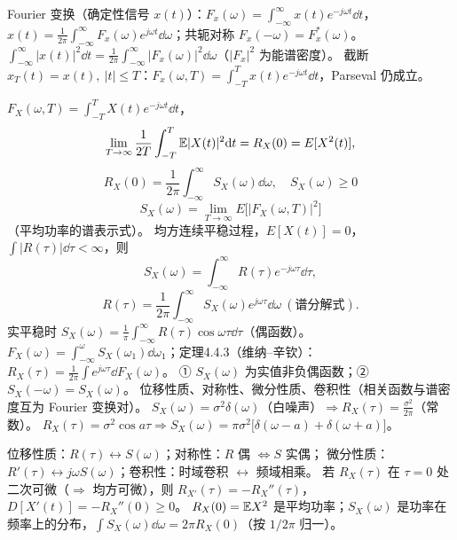 \documentclass[UTF8,12pt,a4paper]{ctexart}
\begin{document}
Fourier 变换（确定性信号 $x(t)$）：$F_x(\omega)=\int_{-\infty}^{\infty}x(t)e^{-j\omega t}\dd t$，$x(t)=\frac1{2\pi}\int_{-\infty}^{\infty}F_x(\omega)e^{j\omega t}\dd\omega$；共轭对称 $F_x(-\omega)=F_x^*(\omega)$。
 $\displaystyle\int_{-\infty}^{\infty}|x(t)|^2\dd t=\frac1{2\pi}\int_{-\infty}^{\infty}|F_x(\omega)|^2\dd\omega$（$|F_x|^2$ 为能谱密度）。
截断 $x_T(t)=x(t),\ |t|\le T$：$F_x(\omega,T)=\int_{-T}^{T}x(t)e^{-j\omega t}\dd t$，Parseval 仍成立。

 $F_X(\omega,T)=\int_{-T}^{T}X(t)e^{-j\omega t}\dd t$，
$$\lim_{T\to\infty}\frac1{2T}\int_{-T}^{T}\mathbb{E}|X(t)|^2\mathrm{d} t=R_X(0)=E[X^2(t)],$$
$$\boxed{R_X(0)=\frac1{2\pi}\int_{-\infty}^{\infty}S_X(\omega)\dd\omega,\quad S_X(\omega)\ge0}$$
$$S_X(\omega)=\lim_{T\to\infty}E\big[|F_X(\omega,T)|^2\big]$$
（平均功率的谱表示式）。
 均方连续平稳过程，$E[X(t)]=0$，$\int|R(\tau)|\dd\tau<\infty$，则
$$S_X(\omega)=\int_{-\infty}^{\infty}R(\tau)e^{-j\omega\tau}\dd\tau,$$
$$R(\tau)=\frac1{2\pi}\int_{-\infty}^{\infty}S_X(\omega)e^{j\omega\tau}\dd\omega\ (\text{谱分解式}).$$
实平稳时 $S_X(\omega)=\frac1\pi\int_{-\infty}^{\infty}R(\tau)\cos\omega\tau\dd\tau$（偶函数）。
 $F_X(\omega)=\int_{-\infty}^{\omega}S_X(\omega_1)\dd\omega_1$；定理4.4.3（维纳--辛钦）：$R_X(\tau)=\frac1{2\pi}\int e^{j\omega\tau}\dd F_X(\omega)$。
 ① $S_X(\omega)$ 为实值非负偶函数；② $S_X(-\omega)=S_X(\omega)$。
 位移性质、对称性、微分性质、卷积性（相关函数与谱密度互为 Fourier 变换对）。
 $S_X(\omega)=\sigma^2\delta(\omega)$（白噪声）$\Rightarrow R_X(\tau)=\frac{\sigma^2}{2\pi}$（常数）。
$R_X(\tau)=\sigma^2\cos a\tau\Rightarrow S_X(\omega)=\pi\sigma^2\big[\delta(\omega-a)+\delta(\omega+a)\big]$。


 位移性质：$R(\tau)\leftrightarrow S(\omega)$；对称性：$R$ 偶 $\Leftrightarrow S$ 实偶；
微分性质：$R'(\tau)\leftrightarrow j\omega S(\omega)$；卷积性：时域卷积 $\leftrightarrow$ 频域相乘。
 若 $R_X(\tau)$ 在 $\tau=0$ 处二次可微（$\Rightarrow$ 均方可微），则 $R_{X'}(\tau)=-R_X''(\tau)$，$D[X'(t)]=-R_X''(0)\ge0$。
 $R_X(0)=\mathbb{E} X^2$ 是平均功率；$S_X(\omega)$ 是功率在频率上的分布，$\int S_X(\omega)\dd\omega=2\pi R_X(0)$（按 $1/2\pi$ 归一）。
\end{document}
